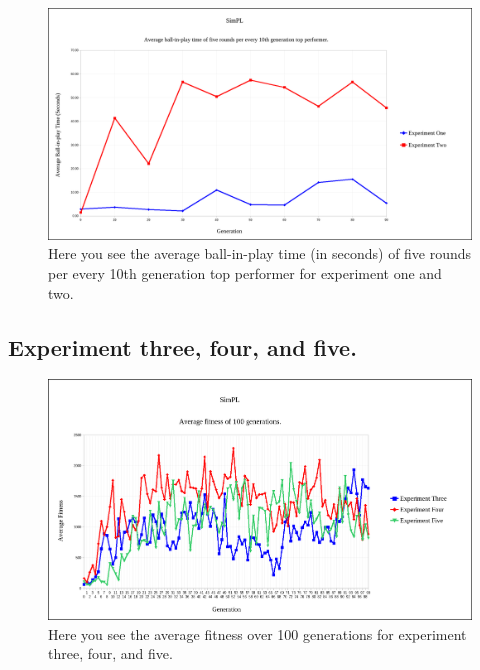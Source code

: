 \documentclass[a4paper,10pt]{article}
\begin{document}
\begin{figure}[H]  
  \centering
  \includegraphics[width=1\textwidth]{figures/exp12_10_tops_times.png}
  \caption{Here you see the average ball-in-play time (in seconds) of five rounds per every 10th generation top performer for experiment one and two.}
  \label{fig:exp12_10_tops_times}
\end{figure}

\subsection{Experiment three, four, and five.}

\begin{figure}[H]  
  \centering
  \includegraphics[width=1\textwidth]{figures/exp345_avg_fit.png}
  \caption{Here you see the average fitness over 100 generations for experiment three, four, and five.}
  \label{fig:exp345_avg_fit}
\end{figure}
\end{document}
